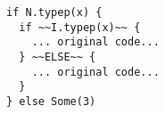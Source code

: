 \begin{lstlisting}[style=reclojureScala]
if N.typep(x) {
  if ~~I.typep(x)~~ {
    ... original code...
  } ~~ELSE~~ {
    ... original code...
  }
} else Some(3)
\end{lstlisting}

